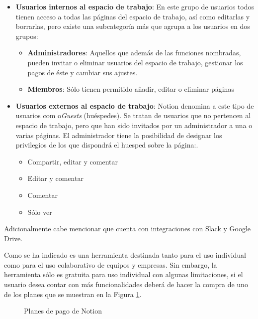 \begin{itemize}
    \item \textbf{Usuarios internos al espacio de trabajo}: En este grupo de usuarios todos tienen acceso a todas las páginas del espacio de trabajo, así como editarlas y borrarlas, pero existe una subcategoría más que agrupa a los usuarios en dos grupos:
        \begin{itemize}
            \item \textbf{Administradores}: Aquellos que además de las funciones nombradas, pueden invitar o eliminar usuarios del espacio de trabajo, gestionar los pagos de éste y cambiar sus ajustes.
            \item \textbf{Miembros}: Sólo tienen permitido añadir, editar o eliminar páginas
        \end{itemize}
    
    \item \textbf{Usuarios externos al espacio de trabajo}: Notion denomina a este tipo de usuarios com o\textit{Guests} (huéspedes). Se tratan de usuarios que no pertencen al espacio de trabajo, pero que han sido invitados por un administrador a una o varias páginas. El administrador tiene la posibilidad de designar los privilegios de los que dispondrá el huesped sobre la página:.
        \begin{itemize}
            \item Compartir, editar y comentar
            \item Editar y comentar
            \item Comentar
            \item Sólo ver
        \end{itemize}
\end{itemize}

Adicionalmente cabe mencionar que cuenta con integraciones con Slack y Google Drive. \bigskip

Como se ha indicado es una herramienta destinada tanto para el uso individual como para el uso colaborativo de equipos y empresas. Sin embargo, la herramienta sólo es gratuita para uso individual con algunas limitaciones, si el usuario desea contar con más funcionalidades deberá de hacer la compra de uno de los planes que se muestran en la Figura \ref{fig:precios-notion}.

\begin{figure}[H]
    \caption{Planes de pago de Notion}
    \label{fig:precios-notion}
\end{figure}


